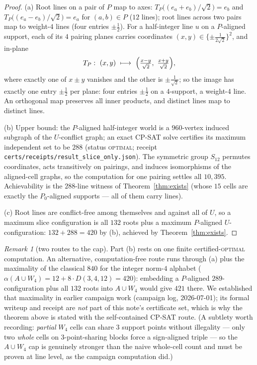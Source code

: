 \documentclass[11pt]{article}
\theoremstyle{remark}
\newtheorem{remark}[theorem]{Remark}
\begin{document}
\begin{proof}
(a) Root lines on a pair of $P$ map to axes:
$T_P\bigl((e_a+e_b)/\sqrt2\bigr)=e_b$ and
$T_P\bigl((e_a-e_b)/\sqrt2\bigr)=e_a$ for $(a,b)\in P$ ($12$ lines);
root lines across two pairs map to weight-$4$ lines (four entries
$\pm\tfrac12$). For a half-integer line $u$ on a $P$-aligned support, each
of its $4$ pairing planes carries coordinates
$(x,y)\in\{\pm\tfrac1{2\sqrt2}\}^2$, and in-plane
\[
T_P:\ (x,y)\ \longmapsto\
\Bigl(\tfrac{x-y}{\sqrt2},\ \tfrac{x+y}{\sqrt2}\Bigr),
\]
where exactly one of $x\pm y$ vanishes and the other is $\pm\tfrac1{\sqrt2}$;
so the image has exactly one entry $\pm\tfrac12$ per plane: four entries
$\pm\tfrac12$ on a $4$-support, a weight-$4$ line. An orthogonal map
preserves all inner products, and distinct lines map to distinct lines.

(b) Upper bound: the $P$-aligned half-integer world is a $960$-vertex
induced subgraph of the $U$-conflict graph; an exact CP-SAT \cite{CPSAT}
solve certifies its maximum independent set to be $288$
(status \textsc{optimal}; receipt
\texttt{certs/receipts/result\_slice\_only.json}).
The symmetric group $S_{12}$ permutes coordinates, acts transitively on
pairings, and induces isomorphisms of the aligned-cell graphs, so the
computation for one pairing settles all $10{,}395$. Achievability is the
$288$-line witness of Theorem~\ref{thm:exists} (whose $15$ cells are
exactly the $P_0$-aligned supports --- all of them carry lines).

(c) Root lines are conflict-free among themselves and against all of $U$,
so a maximum slice configuration is all $132$ roots plus a maximum
$P$-aligned $U$-configuration: $132+288=420$ by (b), achieved by
Theorem~\ref{thm:exists}.
\end{proof}

\begin{remark}[two routes to the cap]
Part (b) rests on one finite certified-\textsc{optimal} computation. An
alternative, computation-free route runs through (a) plus the maximality of
the classical $840$ for the integer norm-$4$ alphabet
($\alpha(A\cup W_4)=12+8\cdot D(3,4,12)=420$): embedding a $P$-aligned
$289$-configuration plus all $132$ roots into $A\cup W_4$ would give $421$
there. We established that maximality in earlier campaign work (campaign log,
2026-07-01); its formal writeup and receipt are \emph{not} part of this
note's certificate set, which is why the theorem above is stated with the
self-contained CP-SAT route. (A subtlety worth recording: \emph{partial}
$W_4$ cells can share $3$ support points without illegality --- only two
\emph{whole} cells on $3$-point-sharing blocks force a sign-aligned triple
--- so the $A\cup W_4$ cap is genuinely stronger than the naive whole-cell
count and must be proven at line level, as the campaign computation did.)
\end{remark}
\end{document}
